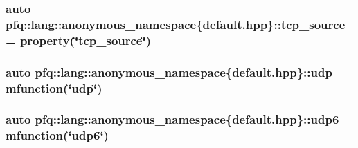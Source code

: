 \hypertarget{namespacepfq_1_1lang_1_1anonymous__namespace_02default_8hpp_03_a367a9ec6d91677553073c54a059b391d}{
\subsubsection[{tcp\+\_\+source}]{\setlength{\rightskip}{0pt plus 5cm}auto pfq\+::lang\+::anonymous\+\_\+namespace\{default.\+hpp\}\+::tcp\+\_\+source = {\bf property}(\char`\"{}tcp\+\_\+source\char`\"{})}}\label{namespacepfq_1_1lang_1_1anonymous__namespace_02default_8hpp_03_a367a9ec6d91677553073c54a059b391d}
\hypertarget{namespacepfq_1_1lang_1_1anonymous__namespace_02default_8hpp_03_a0b8b927aad3be7034521ebde0dabf7d3}{
\subsubsection[{udp}]{\setlength{\rightskip}{0pt plus 5cm}auto pfq\+::lang\+::anonymous\+\_\+namespace\{default.\+hpp\}\+::udp = {\bf mfunction}(\char`\"{}udp\char`\"{})}}\label{namespacepfq_1_1lang_1_1anonymous__namespace_02default_8hpp_03_a0b8b927aad3be7034521ebde0dabf7d3}
\hypertarget{namespacepfq_1_1lang_1_1anonymous__namespace_02default_8hpp_03_a37f7f4eb5cff8508b956eba7dee75a45}{
\subsubsection[{udp6}]{\setlength{\rightskip}{0pt plus 5cm}auto pfq\+::lang\+::anonymous\+\_\+namespace\{default.\+hpp\}\+::udp6 = {\bf mfunction}(\char`\"{}udp6\char`\"{})}}\label{namespacepfq_1_1lang_1_1anonymous__namespace_02default_8hpp_03_a37f7f4eb5cff8508b956eba7dee75a45}
